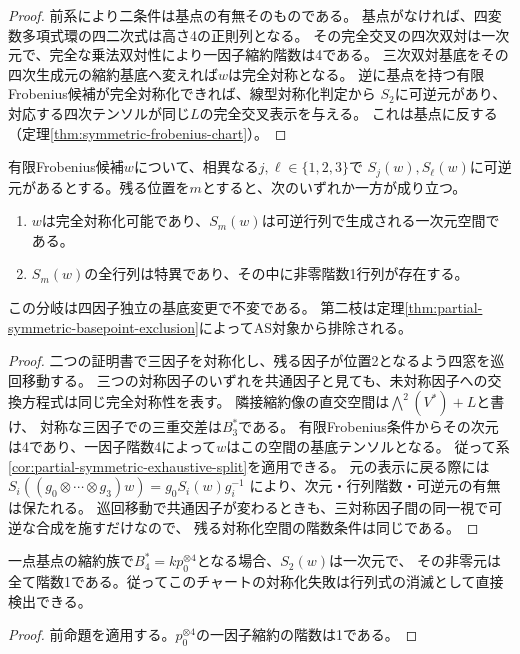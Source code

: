 \begin{proof}
前系により二条件は基点の有無そのものである。
基点がなければ、四変数多項式環の四二次式は高さ4の正則列となる。
その完全交叉の四次双対は一次元で、完全な乗法双対性により一因子縮約階数は4である。
三次双対基底をその四次生成元の縮約基底へ変えれば$w$は完全対称となる。
逆に基点を持つ有限Frobenius候補が完全対称化できれば、線型対称化判定から
$S_2$に可逆元があり、対応する四次テンソルが同じ$L$の完全交叉表示を与える。
これは基点に反する（定理\ref{thm:symmetric-frobenius-chart}）。
\end{proof}
\begin{proposition}[二つの対称化証明書を持つ全候補の分岐]
\label{prop:two-positive-global-split}
有限Frobenius候補$w$について、相異なる$j,\ell\in\{1,2,3\}$で
$S_j(w),S_\ell(w)$に可逆元があるとする。残る位置を$m$とすると、次のいずれか一方が成り立つ。
\begin{enumerate}
\item $w$は完全対称化可能であり、$S_m(w)$は可逆行列で生成される一次元空間である。
\item $S_m(w)$の全行列は特異であり、その中に非零階数1行列が存在する。
\end{enumerate}
この分岐は四因子独立の基底変更で不変である。
第二枝は定理\ref{thm:partial-symmetric-basepoint-exclusion}によってAS対象から排除される。
\end{proposition}
\begin{proof}
二つの証明書で三因子を対称化し、残る因子が位置2となるよう四窓を巡回移動する。
三つの対称因子のいずれを共通因子と見ても、未対称因子への交換方程式は同じ完全対称性を表す。
隣接縮約像の直交空間は$\bigwedge^2(V^*)+L$と書け、
対称な三因子での三重交差は$B_3^*$である。
有限Frobenius条件からその次元は4であり、一因子階数4によって$w$はこの空間の基底テンソルとなる。
従って系\ref{cor:partial-symmetric-exhaustive-split}を適用できる。
元の表示に戻る際には
$S_i((g_0\otimes\cdots\otimes g_3)w)=g_0 S_i(w)g_i^{-1}$
により、次元・行列階数・可逆元の有無は保たれる。
巡回移動で共通因子が変わるときも、三対称因子間の同一視で可逆な合成を施すだけなので、
残る対称化空間の階数条件は同じである。
\end{proof}

\begin{corollary}\label{cor:one-basepoint-symmetrizer}
一点基点の縮約族で$B_4^*=k p_0^{\otimes4}$となる場合、$S_2(w)$は一次元で、
その非零元は全て階数1である。従ってこのチャートの対称化失敗は行列式の消滅として直接検出できる。
\end{corollary}
\begin{proof}
前命題を適用する。$p_0^{\otimes4}$の一因子縮約の階数は1である。
\end{proof}

